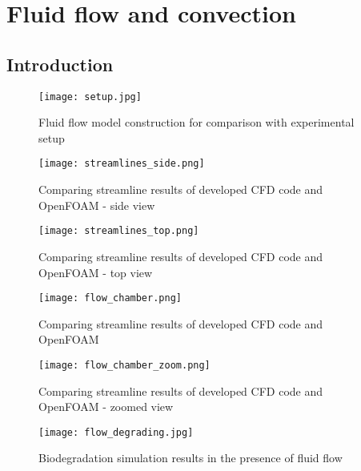 \chapter{Fluid flow and convection}\label{ch:fluid}

\section{Introduction}

\begin{figure}[h]
\centering
\medskip
\texttt{[image: setup.jpg]}
\caption[Fluid flow model construction for comparison with experimental setup]{Fluid flow model construction for comparison with experimental setup} \label{fig:fluid_setup}
\end{figure}

\begin{figure}[h]
\centering
\medskip
\texttt{[image: streamlines\_side.png]}
\caption[Comparing streamline results of developed CFD code and OpenFOAM - side view]{Comparing streamline results of developed CFD code and OpenFOAM - side view} \label{fig:fluid_streamlines_side}
\end{figure}


\begin{figure}[h]
\centering
\medskip
\texttt{[image: streamlines\_top.png]}
\caption[Comparing streamline results of developed CFD code and OpenFOAM - top view]{Comparing streamline results of developed CFD code and OpenFOAM - top view} \label{fig:fluid_streamlines_top}
\end{figure}


\begin{figure}[h]
\centering
\medskip
\texttt{[image: flow\_chamber.png]}
\caption[Comparing flow field results of developed CFD code and OpenFOAM]{Comparing streamline results of developed CFD code and OpenFOAM} \label{fig:fluid_flow_chamber}
\end{figure}


\begin{figure}[h]
\centering
\medskip
\texttt{[image: flow\_chamber\_zoom.png]}
\caption[Comparing flow field results of developed CFD code and OpenFOAM - zoomed view]{Comparing streamline results of developed CFD code and OpenFOAM - zoomed view} \label{fig:fluid_flow_chamber_zoom}
\end{figure}

\begin{figure}[h]
\centering
\medskip
\texttt{[image: flow\_degrading.jpg]}
\caption[Biodegradation simulation results in the presence of fluid flow]{Biodegradation simulation results in the presence of fluid flow} \label{fig:fluid_flow_degrading}
\end{figure}


